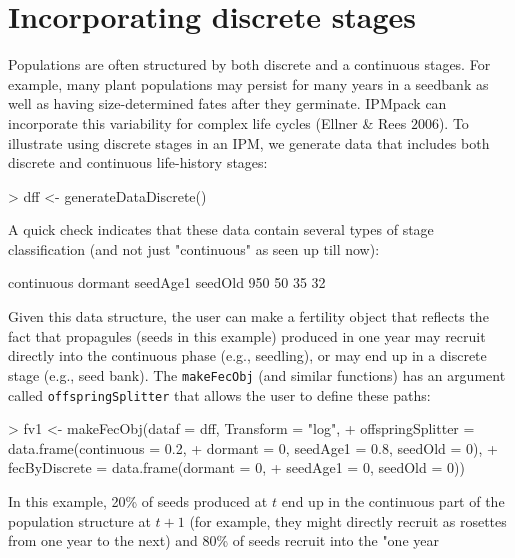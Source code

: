 \documentclass{article}
\begin{document}
\section{Incorporating discrete stages}
Populations are often structured by both discrete and a continuous stages.  For
example, many plant populations may persist for many years in a seedbank as well
as having size-determined fates after they germinate. IPMpack can incorporate
this variability for complex life cycles (Ellner \& Rees $2006$). To illustrate
using discrete stages in an IPM, we generate data that includes
both discrete and continuous life-history stages:
\begin{Schunk}
\begin{Sinput}
> dff <- generateDataDiscrete()
\end{Sinput}
\end{Schunk}
A quick check indicates that these data contain several types of stage classification (and not just "continuous" as seen up till now):
\begin{Schunk}
\begin{Soutput}
continuous    dormant   seedAge1    seedOld 
       950         50         35         32 
\end{Soutput}
\end{Schunk}
Given this data structure, the user can make a fertility object that reflects the
fact that propagules (seeds in this example) produced in one year may 
recruit directly into the continuous phase (e.g., seedling), or may end up in a
discrete stage (e.g., seed bank). The {\tt makeFecObj} (and similar functions)
has an argument called {\tt offspringSplitter} that allows the user to define
these paths:
\begin{Schunk}
\begin{Sinput}
> fv1 <- makeFecObj(dataf = dff, Transform = "log", 
+                   offspringSplitter = data.frame(continuous = 0.2, 
+                   dormant = 0, seedAge1 = 0.8, seedOld = 0), 
+                   fecByDiscrete = data.frame(dormant = 0, 
+                   seedAge1 = 0, seedOld = 0))
\end{Sinput}
\end{Schunk}
In this example, 20\% of seeds produced at $t$ end up in the continuous part of
the population structure at $t+1$ (for example, they might directly recruit as
rosettes from one year to the next) and 80\% of seeds recruit into the "one year
\end{document}
